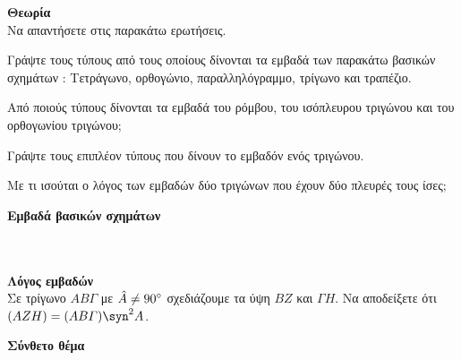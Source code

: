 \documentclass[ektypwsh]{diag-xelatex}
\begin{document}
\begin{thema}
\item \textbf{Θεωρία}\\
Να απαντήσετε στις παρακάτω ερωτήσεις.
\begin{rlist}
\item Γράψτε τους τύπους από τους οποίους δίνονται τα εμβαδά των παρακάτω βασικών σχημάτων : Τετράγωνο, ορθογώνιο, παραλληλόγραμμο, τρίγωνο και τραπέζιο.
\item Από ποιούς τύπους δίνονται τα εμβαδά του ρόμβου, του ισόπλευρου τριγώνου και του ορθογωνίου τριγώνου;\\
\item Γράψτε τους επιπλέον τύπους που δίνουν το εμβαδόν ενός τριγώνου.
\item Με τι ισούται ο λόγος των εμβαδών δύο τριγώνων που έχουν δύο πλευρές τους ίσες;
\end{rlist}
\item \textbf{Εμβαδά βασικών σχημάτων}\\
\mbox{}\\\\
\item \textbf{Λόγος εμβαδών}\\
Σε τρίγωνο $ AB\varGamma $ με $ \hat{A}\neq90\degree $ σχεδιάζουμε τα ύψη $ BZ $ και $ \varGamma H $. Να αποδείξετε ότι $ (AZH)=(AB\varGamma)\syn^2{A} $.
\item \textbf{Σύνθετο θέμα}\\

\end{thema}
\end{document}
